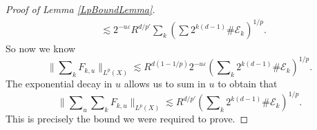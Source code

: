 \begin{proof}[Proof of Lemma \ref{LpBoundLemma}]
\begin{equation}
\begin{split}
    &\lesssim 2^{-u \varepsilon} R^{d/p'} \sum\nolimits_k \left( \sum 2^{k(d-1)} \# \mathcal{E}_k \right)^{1/p}.
\end{split}
\end{equation}
%
So now we know
%
\begin{equation}
    \Big\| \sum\nolimits_k F_{k,u} \Big\|_{L^p(X)} \lesssim R^{d(1-1/p)} 2^{- u \varepsilon} \left( \sum\nolimits_k 2^{k(d-1)} \# \mathcal{E}_k \right)^{1/p}.
\end{equation}
%
The exponential decay in $u$ allows us to sum in $u$ to obtain that
%
\begin{equation}
    \Big\| \sum\nolimits_u \sum\nolimits_k F_{k,u} \Big\|_{L^p(X)} \lesssim R^{d/p'} \left( \sum\nolimits_k 2^{k(d-1)} \# \mathcal{E}_k \right)^{1/p}.
\end{equation}
%
This is precisely the bound we were required to prove.
\end{proof}



